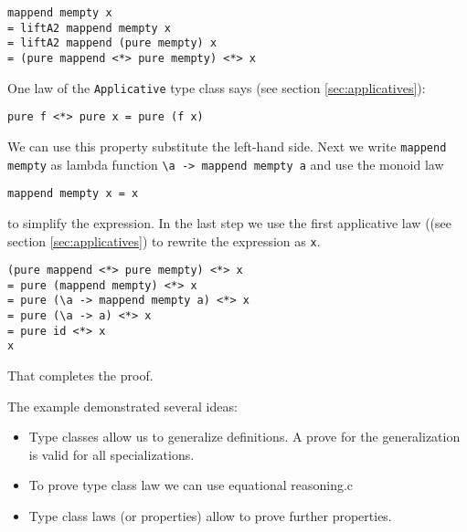 \begin{verbatim}
mappend mempty x        
= liftA2 mappend mempty x
= liftA2 mappend (pure mempty) x
= (pure mappend <*> pure mempty) <*> x
\end{verbatim}

One law of the \verb|Applicative| type class says (see section \ref{sec:applicatives}):
\begin{verbatim}
pure f <*> pure x = pure (f x)
\end{verbatim}
We can use this property substitute the left-hand side. Next we write \verb|mappend mempty| as lambda function \verb|\a -> mappend mempty a| and use the monoid law
\begin{verbatim}
mappend mempty x = x
\end{verbatim}
to simplify the expression. In the last step we use the first applicative law ((see section \ref{sec:applicatives}) to rewrite the expression as \verb|x|.
\begin{verbatim}
(pure mappend <*> pure mempty) <*> x
= pure (mappend mempty) <*> x
= pure (\a -> mappend mempty a) <*> x
= pure (\a -> a) <*> x
= pure id <*> x
x
\end{verbatim}

That completes the proof.

The example demonstrated several ideas:
\begin{itemize}
\item Type classes allow us to generalize definitions. A prove for the generalization is valid for all specializations.
\item To prove type class law we can use equational reasoning.c
\item Type class laws (or properties) allow to prove further properties.
\end{itemize}

